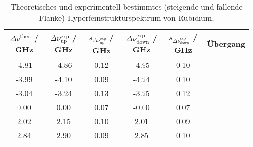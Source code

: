 \begin{table}[H]
\caption{Theoretisches und experimentell bestimmtes (steigende und fallende Flanke) Hyperfeinstrukturspektrum von Rubidium.}
\begin{center}
\begin{tabular}{|c|c|c|c|c|c|}
  \hline
  $\Delta \nu^\text{theo}$ / GHz & $\Delta \nu^\text{exp}_\text{up}$ / GHz & $s_{\Delta \nu^\text{exp}_\text{up}}$ / GHz & $\Delta \nu^\text{exp}_\text{down}$ / GHz & $s_{\Delta \nu^\text{exp}_\text{down}}$ / GHz & Übergang \\ \hline
  -4.81 & -4.86 & 0.12 & -4.95 & 0.10 &  \\ \hline
  -3.99 & -4.10 & 0.09 & -4.24 & 0.10 &  \\ \hline
  -3.04 & -3.24 & 0.13 & -3.25 & 0.12 &  \\ \hline
  0.00 & 0.00 & 0.07 & -0.00 & 0.07 &  \\ \hline
  2.02 & 2.15 & 0.10 & 2.01 & 0.09 &  \\ \hline
  2.84 & 2.90 & 0.09 & 2.85 & 0.10 &  \\ \hline
\end{tabular}
\end{center}
\label{tab:hfs:spectrum}
\end{table}
